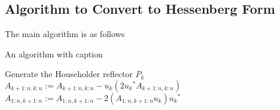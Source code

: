 \subsection{Algorithm to Convert to Hessenberg Form}
The main algorithm is as follows
\begin{algorithm}
\caption{An algorithm with caption}\label{alg:cap}
    \begin{algorithmic}
        \STATE Generate the Householder reflector $P_k$
        \STATE $A_{k+1:n, k:n} := A_{k+1:n, k:n} - \textbf{$u_k$}(2\textbf{$u_k$}^*A_{k+1:n, k:n})$
        \STATE $A_{1:n, k+1:n} := A_{1:n, k+1:n} - 2(A_{1:n, k+1:n}\textbf{$u_k$})\textbf{$u_k$}^*$
    \ENDFOR
   \end{algorithmic}
\end{algorithm}

